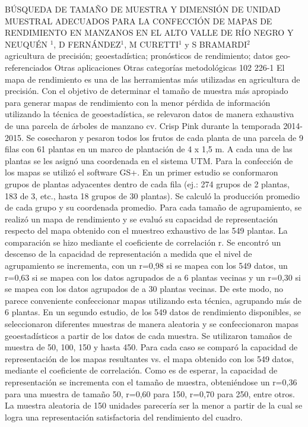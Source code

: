 \A
{BÚSQUEDA DE TAMAÑO DE MUESTRA Y DIMENSIÓN DE UNIDAD MUESTRAL ADECUADOS PARA LA CONFECCIÓN DE MAPAS DE RENDIMIENTO EN MANZANOS EN EL ALTO VALLE DE RÍO NEGRO Y NEUQUÉN}
{$^1$, D FERNÁNDEZ$^1$, M CURETTI$^1$ y S BRAMARDI$^2$}
{
\\}
{agricultura de precisión; geoestadística; pronósticos de rendimiento; datos geo-referenciados} 
 {Otras aplicaciones} 
 {Otras categorías metodológicas} 
 {102} 
 {226-1}
{El mapa de rendimiento es una de las herramientas más utilizadas en agricultura de precisión. Con el objetivo de determinar el tamaño de muestra más apropiado para generar mapas de rendimiento con la menor pérdida de información utilizando la técnica de geoestadística, se relevaron datos de manera exhaustiva de una parcela de árboles de manzano cv. Crisp Pink durante la temporada 2014-2015. Se cosecharon y pesaron todos los frutos de cada planta de una parcela de 9 filas con 61 plantas en un marco de plantación de 4 x 1,5 m. A cada una de las plantas se les asignó una coordenada en el sistema UTM. Para la confección de los mapas se utilizó el software GS+. En un primer estudio se conformaron grupos de plantas adyacentes dentro de cada fila (ej.: 274 grupos de 2 plantas, 183 de 3, etc., hasta 18 grupos de 30 plantas). Se calculó la producción promedio de cada grupo y su coordenada promedio. Para cada tamaño de agrupamiento, se realizó un mapa de rendimiento y se evaluó su capacidad de representación respecto del mapa obtenido con el muestreo exhaustivo de las 549 plantas. La comparación se hizo mediante el coeficiente de correlación r. Se encontró un descenso de la capacidad de representación a medida que el nivel de agrupamiento se incrementa, con un r=0,98 si se mapea con los 549 datos, un r=0,63 si se mapea con los datos agrupados de a 6 plantas vecinas y un r=0,30 si se mapea con los datos agrupados de a 30 plantas vecinas. De este modo, no parece conveniente confeccionar mapas utilizando esta técnica, agrupando más de 6 plantas. En un segundo estudio, de los 549 datos de rendimiento disponibles, se seleccionaron diferentes muestras de manera aleatoria y se confeccionaron mapas geoestadísticos a partir de los datos de cada muestra. Se utilizaron tamaños de muestra de 50, 100, 150 y hasta 450. Para cada caso se comparó la capacidad de representación de los mapas resultantes vs. el mapa obtenido con los 549 datos, mediante el coeficiente de correlación. Como es de esperar, la capacidad de representación se incrementa con el tamaño de muestra, obteniéndose un r=0,36 para una muestra de tamaño 50, r=0,60 para 150, r=0,70 para 250, entre otros. La muestra aleatoria de 150 unidades parecería ser la menor a partir de la cual se logra una representación satisfactoria del rendimiento del cuadro.}
